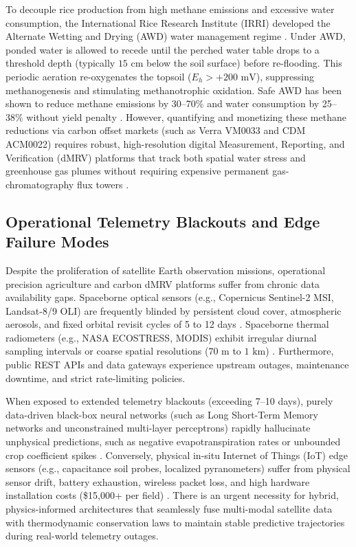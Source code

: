\documentclass[sn-mathphys-num,Numbered]{sn-jnl}
\begin{document}
To decouple rice production from high methane emissions and excessive water consumption, the International Rice Research Institute (IRRI) developed the Alternate Wetting and Drying (AWD) water management regime \cite{Lampayan2015,Bouman2007,Carrijo2017}. Under AWD, ponded water is allowed to recede until the perched water table drops to a threshold depth (typically $15\text{ cm}$ below the soil surface) before re-flooding. This periodic aeration re-oxygenates the topsoil ($E_h > +200\text{ mV}$), suppressing methanogenesis and stimulating methanotrophic oxidation. Safe AWD has been shown to reduce methane emissions by 30--70\% and water consumption by 25--38\% without yield penalty \cite{Carrijo2017,Belder2004}. However, quantifying and monetizing these methane reductions via carbon offset markets (such as Verra VM0033 and CDM ACM0022) requires robust, high-resolution digital Measurement, Reporting, and Verification (dMRV) platforms that track both spatial water stress and greenhouse gas plumes without requiring expensive permanent gas-chromatography flux towers \cite{Jacob2022,Veefkind2012,Friedlingstein2023}.

\subsection{Operational Telemetry Blackouts and Edge Failure Modes}\label{sec:intro_blackouts}
Despite the proliferation of satellite Earth observation missions, operational precision agriculture and carbon dMRV platforms suffer from chronic data availability gaps. Spaceborne optical sensors (e.g., Copernicus Sentinel-2 MSI, Landsat-8/9 OLI) are frequently blinded by persistent cloud cover, atmospheric aerosols, and fixed orbital revisit cycles of 5 to 12 days \cite{Drusch2012,Roy2014}. Spaceborne thermal radiometers (e.g., NASA ECOSTRESS, MODIS) exhibit irregular diurnal sampling intervals or coarse spatial resolutions ($70\text{ m}$ to $1\text{ km}$) \cite{Fisher2017,Li2022,Mu2011}. Furthermore, public REST APIs and data gateways experience upstream outages, maintenance downtime, and strict rate-limiting policies.

When exposed to extended telemetry blackouts (exceeding 7--10 days), purely data-driven black-box neural networks (such as Long Short-Term Memory networks and unconstrained multi-layer perceptrons) rapidly hallucinate unphysical predictions, such as negative evapotranspiration rates or unbounded crop coefficient spikes \cite{Read2019,Willard2022,Karniadakis2021}. Conversely, physical in-situ Internet of Things (IoT) edge sensors (e.g., capacitance soil probes, localized pyranometers) suffer from physical sensor drift, battery exhaustion, wireless packet loss, and high hardware installation costs (\$15,000+ per field) \cite{Vasisht2017,Kamilaris2018}. There is an urgent necessity for hybrid, physics-informed architectures that seamlessly fuse multi-modal satellite data with thermodynamic conservation laws to maintain stable predictive trajectories during real-world telemetry outages.
\end{document}
